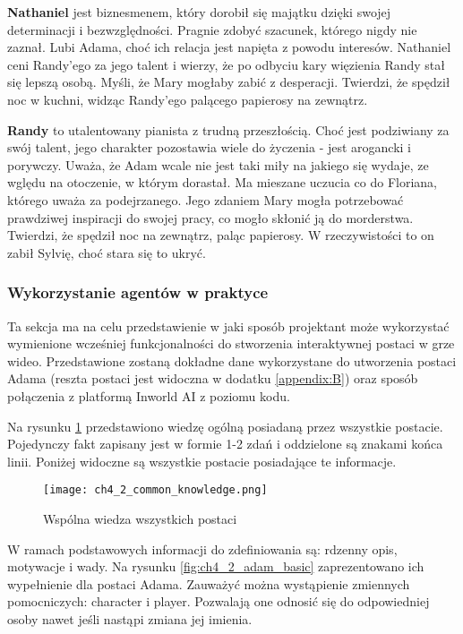 \textbf{Nathaniel} jest biznesmenem, który dorobił się majątku dzięki swojej determinacji i bezwzględności.
Pragnie zdobyć szacunek, którego nigdy nie zaznał. Lubi Adama, choć ich relacja jest
napięta z powodu interesów. Nathaniel ceni Randy'ego za jego talent i wierzy, że po odbyciu kary
więzienia Randy stał się lepszą osobą. Myśli, że Mary mogłaby zabić z desperacji. Twierdzi, że
spędził noc w kuchni, widząc Randy'ego palącego papierosy na zewnątrz.

\textbf{Randy} to utalentowany pianista z trudną przeszłością. Choć jest podziwiany za swój talent, jego
charakter pozostawia wiele do życzenia - jest arogancki i porywczy. Uważa, że Adam wcale nie jest taki
miły na jakiego się wydaje, ze wględu na otoczenie, w którym dorastał. Ma mieszane uczucia co do Floriana,
którego uważa za podejrzanego. Jego zdaniem Mary mogła potrzebować prawdziwej inspiracji do swojej pracy, co
mogło skłonić ją do morderstwa. Twierdzi, że spędził noc na zewnątrz, paląc papierosy. W rzeczywistości
to on zabił Sylvię, choć stara się to ukryć.

\subsubsection*{Wykorzystanie agentów w praktyce}

Ta sekcja ma na celu przedstawienie w jaki sposób projektant może wykorzystać wymienione wcześniej
funkcjonalności do stworzenia interaktywnej postaci w grze wideo. Przedstawione zostaną dokładne dane
wykorzystane do utworzenia postaci Adama (reszta postaci jest widoczna w dodatku \ref{appendix:B}) oraz
sposób połączenia z platformą Inworld AI z poziomu kodu.

\newpage

Na rysunku \ref{fig:ch4_2_common_knowledge} przedstawiono wiedzę ogólną posiadaną przez wszystkie postacie.
Pojedynczy fakt zapisany jest w formie 1-2 zdań i oddzielone są znakami końca linii. Poniżej widoczne
są wszystkie postacie posiadające te informacje.

\begin{figure}[h!]
    \centering
    \texttt{[image: ch4\_2\_common\_knowledge.png]}
    \caption{Wspólna wiedza wszystkich postaci}
    \label{fig:ch4_2_common_knowledge}
\end{figure}

\newpage

W ramach podstawowych informacji do zdefiniowania są: rdzenny opis, motywacje i wady. Na rysunku
\ref{fig:ch4_2_adam_basic} zaprezentowano ich wypełnienie dla postaci Adama. Zauważyć można wystąpienie
zmiennych pomocniczych: {character} i {player}. Pozwalają one odnosić się do odpowiedniej osoby nawet
jeśli nastąpi zmiana jej imienia.


